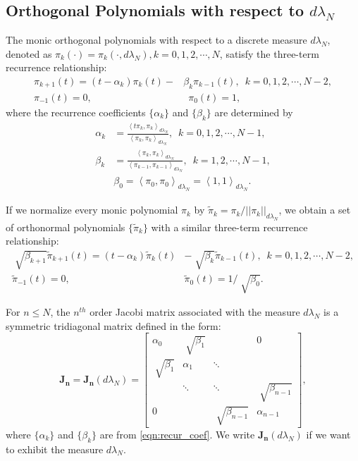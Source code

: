 \documentclass[11pt,letter]{article}
\begin{document}
\subsection{Orthogonal Polynomials with respect to $d\lambda_N$}
The monic orthogonal polynomials with respect to a discrete measure $d\lambda_N$, denoted as $\pi_k(\cdot)=\pi_k(\cdot,d\lambda_N),k=0,1,2,\cdots,N$, satisfy the three-term recurrence relationship:
\begin{equation}
\label{eqn:three_term_recur}
\begin{split}
\pi_{k+1}(t)=(t-\alpha_k)\pi_k(t)-&\beta_k\pi_{k-1}(t),\,\,\, k=0,1,2,\cdots,N-2,\\
\pi_{-1}(t)=0,&\,\,\,\pi_{0}(t)=1,
\end{split}
\end{equation}
where the recurrence coefficients $\{\alpha_k\}$ and $\{\beta_k\}$ are determined by
\begin{equation}
\label{eqn:recur_coef}
\begin{split}
\alpha_k&=\frac{\left<t\pi_k,\pi_k\right>_{d\lambda_N}}{\left<\pi_k,\pi_k\right>_{d\lambda_N}},\,\,\, k=0,1,2,\cdots,N-1,\\
\beta_k&=\frac{\left<\pi_k,\pi_k\right>_{d\lambda_N}}{\left<\pi_{k-1},\pi_{k-1}\right>_{d\lambda_N}},\,\,\, k=1,2,\cdots,N-1,\\
&\beta_0=\left<\pi_0,\pi_0\right>_{d\lambda_N}=\left<1,1\right>_{d\lambda_N}.
\end{split}
\end{equation}

If we normalize every monic polynomial $\pi_k$ by $\tilde{\pi}_k=\pi_k/||\pi_k||_{d\lambda_N}$, we obtain a set of orthonormal polynomials $\{\tilde{\pi}_k\}$ with a similar three-term recurrence relationship:
\begin{equation}
\label{eqn:three_term_recur_normal}
\begin{split}
\sqrt[]{\beta_{k+1}}\tilde{\pi}_{k+1}(t)=(t-\alpha_k)\tilde{\pi}_k(t)&-\sqrt[]{\beta_k}\tilde{\pi}_{k-1}(t),\,\,\, k=0,1,2,\cdots,N-2,\\
\tilde{\pi}_{-1}(t)=0,\,\,\,&\tilde{\pi}_{0}(t)=1/\sqrt[]{\beta_0}.
\end{split}
\end{equation}

For $n\leq N$, the $n^{th}$ order Jacobi matrix associated with the measure $d\lambda_N$ is a symmetric tridiagonal matrix defined in the form:
\begin{equation}
\label{eqn:def_jn}
\mathbf{J_n}=\mathbf{J_n}(d\lambda_N)=\begin{bmatrix}\alpha_0 & \sqrt[]{\beta_1} & & 0\\
\sqrt[]{\beta_1} & \alpha_1 & \ddots & \\
& \ddots & \ddots & \sqrt[]{\beta_{n-1}} \\
0& & \sqrt[]{\beta_{n-1}} & \alpha_{n-1}
\end{bmatrix},
\end{equation}
where $\{\alpha_k\}$ and $\{\beta_k\}$ are from \eqref{eqn:recur_coef}. We write $\mathbf{J_n}(d\lambda_N)$ if we want to exhibit the measure $d\lambda_N$.\\
\end{document}
